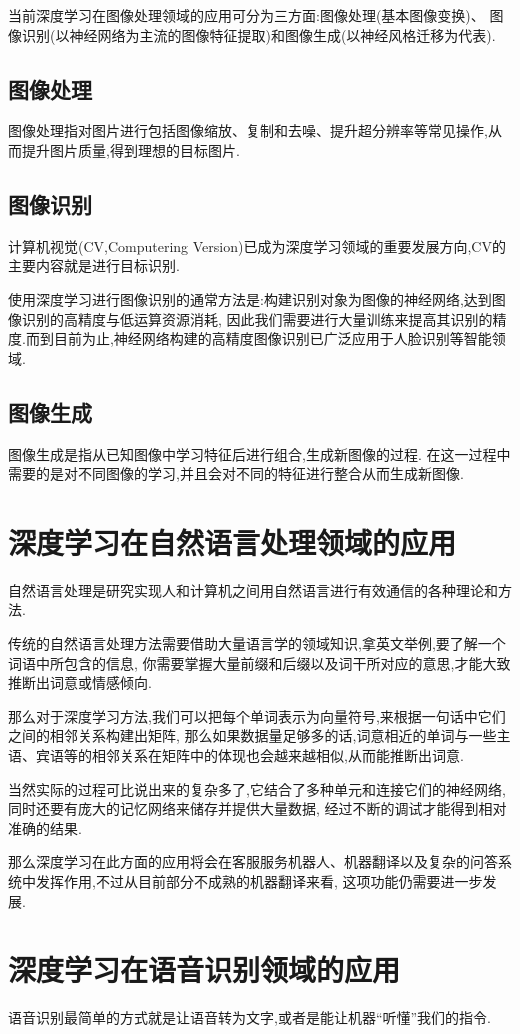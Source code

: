 \documentclass[UTF8]{ctexbook}
\begin{document}
当前深度学习在图像处理领域的应用可分为三方面:图像处理(基本图像变换)、
图像识别(以神经网络为主流的图像特征提取)和图像生成(以神经风格迁移为代表).
\subsection{图像处理}
图像处理指对图片进行包括图像缩放、复制和去噪、提升超分辨率等常见操作,从而提升图片质量,得到理想的目标图片.
\subsection{图像识别}
计算机视觉(CV,Computering Version)已成为深度学习领域的重要发展方向,CV的主要内容就是进行目标识别.

使用深度学习进行图像识别的通常方法是:构建识别对象为图像的神经网络,达到图像识别的高精度与低运算资源消耗,
因此我们需要进行大量训练来提高其识别的精度.而到目前为止,神经网络构建的高精度图像识别已广泛应用于人脸识别等智能领域.
\subsection{图像生成}
图像生成是指从已知图像中学习特征后进行组合,生成新图像的过程.
在这一过程中需要的是对不同图像的学习,并且会对不同的特征进行整合从而生成新图像.
\section{深度学习在自然语言处理领域的应用}
自然语言处理是研究实现人和计算机之间用自然语言进行有效通信的各种理论和方法.

传统的自然语言处理方法需要借助大量语言学的领域知识,拿英文举例,要了解一个词语中所包含的信息,
你需要掌握大量前缀和后缀以及词干所对应的意思,才能大致推断出词意或情感倾向.

那么对于深度学习方法,我们可以把每个单词表示为向量符号,来根据一句话中它们之间的相邻关系构建出矩阵,
那么如果数据量足够多的话,词意相近的单词与一些主语、宾语等的相邻关系在矩阵中的体现也会越来越相似,从而能推断出词意.

当然实际的过程可比说出来的复杂多了,它结合了多种单元和连接它们的神经网络,同时还要有庞大的记忆网络来储存并提供大量数据,
经过不断的调试才能得到相对准确的结果.

那么深度学习在此方面的应用将会在客服服务机器人、机器翻译以及复杂的问答系统中发挥作用,不过从目前部分不成熟的机器翻译来看,
这项功能仍需要进一步发展.

\section{深度学习在语音识别领域的应用}
语音识别最简单的方式就是让语音转为文字,或者是能让机器“听懂”我们的指令.
\end{document}
